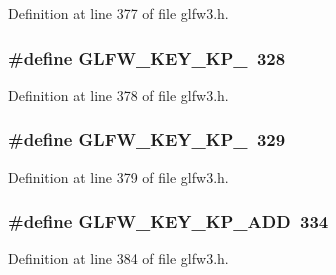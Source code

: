 Definition at line 377 of file glfw3.\-h.

\hypertarget{group__keys_gab2ea2e6a12f89d315045af520ac78cec}{
\subsubsection[{G\-L\-F\-W\-\_\-\-K\-E\-Y\-\_\-\-K\-P\-\_\-8}]{\setlength{\rightskip}{0pt plus 5cm}\#define G\-L\-F\-W\-\_\-\-K\-E\-Y\-\_\-\-K\-P\-\_~328}}\label{group__keys_gab2ea2e6a12f89d315045af520ac78cec}


Definition at line 378 of file glfw3.\-h.

\hypertarget{group__keys_gafb21426b630ed4fcc084868699ba74c1}{
\subsubsection[{G\-L\-F\-W\-\_\-\-K\-E\-Y\-\_\-\-K\-P\-\_\-9}]{\setlength{\rightskip}{0pt plus 5cm}\#define G\-L\-F\-W\-\_\-\-K\-E\-Y\-\_\-\-K\-P\-\_~329}}\label{group__keys_gafb21426b630ed4fcc084868699ba74c1}


Definition at line 379 of file glfw3.\-h.

\hypertarget{group__keys_gad09c7c98acc79e89aa6a0a91275becac}{
\subsubsection[{G\-L\-F\-W\-\_\-\-K\-E\-Y\-\_\-\-K\-P\-\_\-\-A\-D\-D}]{\setlength{\rightskip}{0pt plus 5cm}\#define G\-L\-F\-W\-\_\-\-K\-E\-Y\-\_\-\-K\-P\-\_\-\-A\-D\-D~334}}\label{group__keys_gad09c7c98acc79e89aa6a0a91275becac}


Definition at line 384 of file glfw3.\-h.

